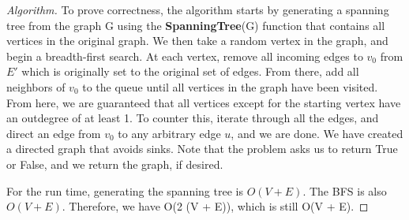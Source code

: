 \documentclass[11pt]{article}
\begin{document}
\begin{enumerate}[leftmargin=*,start=0]
\begin{proof}[Algorithm]
\hfill

To prove correctness, the algorithm starts by generating a spanning tree from the graph G using the
\textbf{SpanningTree}(G) function that contains all vertices in the original graph. We then take a random vertex in the graph,
and begin a breadth-first search. At each vertex, remove all incoming edges to $v_0$ from $E'$ which is 
originally set to the original set of edges. From there, add all neighbors of $v_0$ to the queue 
until all vertices in the graph have been visited. From here, we are guaranteed 
that all vertices except for the starting vertex have an outdegree of at least 1.
To counter this, iterate through all the edges, and direct an edge from $v_0$ to 
any arbitrary edge $u$, and we are done. We have created a directed graph that avoids sinks. 
Note that the problem asks us to return True or False, and we return the graph, if desired.

For the run time, generating the spanning tree is $O(V + E)$. The BFS is also $O(V + E)$. 
Therefore, we have O(2 (V + E)), which is still O(V + E). 
  
\end{proof}

\newpage

\end{enumerate}
\end{document}
